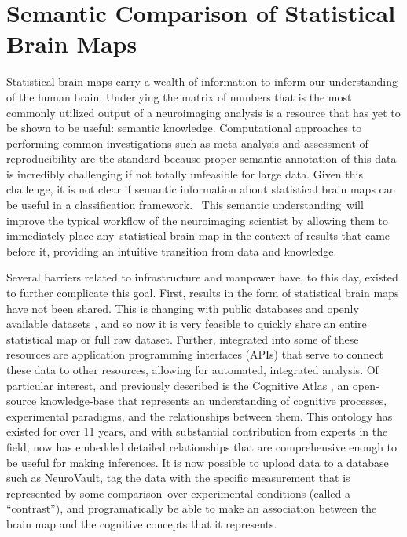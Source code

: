 \documentclass{report}
\begin{document}
\section{Semantic Comparison of Statistical Brain Maps}
Statistical brain maps carry a wealth of information to inform our
understanding of the human brain. Underlying the matrix of numbers that
is the most commonly utilized output of a neuroimaging analysis is a
resource that has yet to be shown to be useful: semantic knowledge. Computational approaches to performing common investigations such as meta-analysis and assessment of reproducibility are the standard because
proper semantic annotation of this data is incredibly challenging if not
totally unfeasible for large data. Given this challenge, it is not
clear if semantic information about statistical brain maps can be useful
in a classification framework. ~This semantic understanding~will improve
the typical workflow of the neuroimaging scientist by allowing them to
immediately place any~statistical brain map in the context of results
that came before it, providing an intuitive transition from data and
knowledge.

Several barriers related to infrastructure and manpower have, to this
day, existed to further complicate this goal. First, results in the form
of statistical brain maps have not been shared. This is changing with
public databases and openly available datasets \cite{Gorgolewski2015-gu,Van_Essen2013-fi,Hall2012-qo,Reid2015-gt}, and so now it is very feasible to quickly share an entire statistical
map or full raw dataset. Further, integrated into some of these
resources are application programming interfaces (APIs) that serve to
connect these data to other resources, allowing for automated,
integrated analysis. Of particular interest, and previously described is the Cognitive Atlas \cite{Poldrack2011-jp}, an open-source knowledge-base that represents an understanding of
cognitive processes, experimental paradigms, and the relationships
between them. This ontology has existed for over 11 years, and with
substantial contribution from experts in the field, now has embedded
detailed relationships that are comprehensive enough to be useful for
making inferences. It is now possible to upload data to a database such
as NeuroVault, tag the data with the specific measurement that is
represented by some comparison~over experimental conditions (called a
``contrast''), and programatically be able to make an association
between the brain map and the cognitive concepts that it represents.
\end{document}
